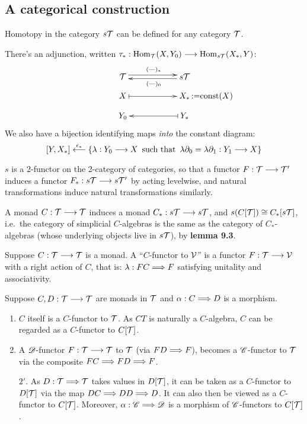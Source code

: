 \documentclass[11pt]{article}
\begin{document}
\begin{chapter7-9}
\setcounter{section}{8}
\section{A categorical construction}
\begin{itemise}
\item Homotopy in the category $s\mathcal{T}$ can be defined for any category $\mathcal{T}$.
\item There's an adjunction, written $\tau_*:\operatorname{Hom}_{\mathcal{T}}(X,Y_0)\longrightarrow\operatorname{Hom}_{s\mathcal{T}}(X_*,Y)$:
\[\xymatrix@R=.3cm@C=2cm{
\calT  \ar@<.6ex>[r]^{(\DASH)_*}&
s\calT  \ar@<.4ex>[l]^{(\DASH)_0}\\
X \ar@{|->}[r] & X_*\makebox[0cm][l]{\,:=$\textup{const}(X)$}\\
Y_0             & Y_* \ar@{|->}[l]\\
}\]
We also have a bijection identifying maps \emph{into} the constant diagram:
\[[Y,X_*]\overset{\epsilon_*}{\longleftarrow}\left\{\lambda:Y_0\longrightarrow X\,\textup{\ such that\ }\,
\lambda\partial_0=\lambda\partial_1:Y_1\longrightarrow X\right\}\]
\item $s$ is a 2-functor on the 2-category of categories, so that a functor $F:\mathcal{T}\longrightarrow\mathcal{T}'$ induces a functor $F_*:s\mathcal{T}\longrightarrow s\mathcal{T}'$ by acting levelwise, and natural transformations induce natural transformations similarly.
\item A monad $C:\mathcal{T}\longrightarrow\mathcal{T}$ induces a monad $C_*:s\mathcal{T}\longrightarrow s\mathcal{T}$, and $s(C[\mathcal{T}])\cong C_*[s\mathcal{T}]$, i.e.\ the category of simplicial $C$-algebras is the same as the category of $C_*$-algebras (whose underlying objects live in $s\mathcal{T}$), by \textbf{lemma 9.3}.
\item Suppose $C:\mathcal{T}\longrightarrow\mathcal{T}$ is a monad. A ``$C$-functor to $\mathcal{V}$'' is a functor $F:\mathcal{T}\longrightarrow \mathcal{V}$ with a right action of $C$, that is: $\lambda:FC\Longrightarrow F$ satisfying unitality and associativity.
\begin{exmps*}[9.5]
Suppose $C,D:\mathcal{T}\longrightarrow\mathcal{T}$ are monads in $\mathcal{T}$ and  $\alpha:C\Longrightarrow D$ is a morphism.
\begin{enumerate}\squishlist
\item $C$ itself is a $C$-functor to $\mathcal{T}$. As $CT$ is naturally a $C$-algebra, $C$ can be regarded as a $C$-functor to $C[\mathcal{T}]$.
\item %
A $\mathscr{D}$-functor $F:\mathcal{T}\longrightarrow\mathcal{T}$ to $\mathcal{T}$ (via $FD\Longrightarrow F$), becomes a $\mathscr{C}$-functor to $\mathcal{T}$ via the composite $FC\Longrightarrow FD\Longrightarrow F$.
\item[$2'$.] As $D:\mathcal{T}\Longrightarrow \mathcal{T}$ takes values in $D[\mathcal{T}]$, it can be taken as a $C$-functor to $D[\mathcal{T}]$ via the map $DC\Longrightarrow DD\Longrightarrow D$. It can also then be viewed as a $C$-functor to $C[\mathcal{T}]$. Moreover, $\alpha:\mathscr{C}\Longrightarrow\mathscr{D}$ is a morphism of $\mathscr{C}$-functors to $C[\mathcal{T}]$.

\end{enumerate}
\end{exmps*}
\end{itemise}
\end{chapter7-9}
\end{document}
